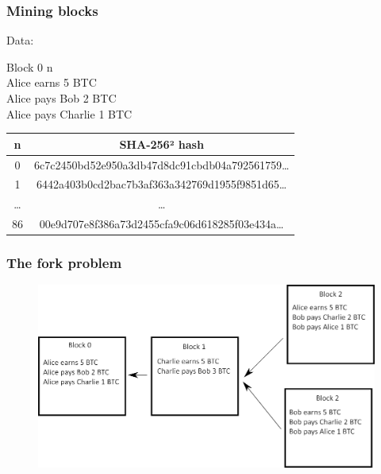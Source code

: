 \documentclass{beamer}
\begin{document}
\begin{frame}

\frametitle{Mining blocks}

Data:\\
\vspace{0.5cm}

Block 0 n\\
Alice earns 5 BTC\\
Alice pays Bob 2 BTC\\
Alice pays Charlie 1 BTC\\

\vspace{0.5cm}
\begin{tabular}{| c | c |}
	\hline
   n     & SHA-256² hash\\ \hline
   0     & 6c7c2450bd52e950a3db47d8dc91cbdb04a792561759\dots \\ \hline
   1     & 6442a403b0cd2bac7b3af363a342769d1955f9851d65\dots \\ \hline
   \dots & \dots \\ \hline
   86    & 00e9d707e8f386a73d2455cfa9c06d618285f03e434a\dots\\
	\hline
 \end{tabular}

\end{frame}


\begin{frame}

\frametitle{The fork problem}

\begin{figure}[H]
		\includegraphics[width=\linewidth]{illustrationsSoutenance/forkEN.png}
	\end{figure}

\end{frame}
\end{document}
